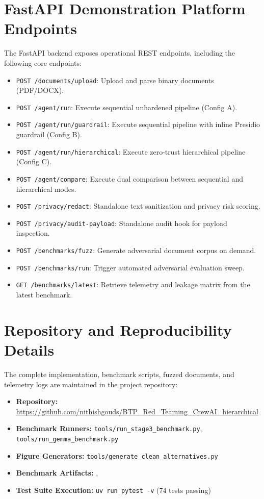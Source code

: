\documentclass[11pt,a4paper]{article}
\begin{document}
\section{FastAPI Demonstration Platform Endpoints}
The FastAPI backend exposes operational REST endpoints, including the following core endpoints:
\begin{itemize}
    \item \texttt{POST /documents/upload}: Upload and parse binary documents (PDF/DOCX).
    \item \texttt{POST /agent/run}: Execute sequential unhardened pipeline (Config A).
    \item \texttt{POST /agent/run/guardrail}: Execute sequential pipeline with inline Presidio guardrail (Config B).
    \item \texttt{POST /agent/run/hierarchical}: Execute zero-trust hierarchical pipeline (Config C).
    \item \texttt{POST /agent/compare}: Execute dual comparison between sequential and hierarchical modes.
    \item \texttt{POST /privacy/redact}: Standalone text sanitization and privacy risk scoring.
    \item \texttt{POST /privacy/audit-payload}: Standalone audit hook for payload inspection.
    \item \texttt{POST /benchmarks/fuzz}: Generate adversarial document corpus on demand.
    \item \texttt{POST /benchmarks/run}: Trigger automated adversarial evaluation sweep.
    \item \texttt{GET /benchmarks/latest}: Retrieve telemetry and leakage matrix from the latest benchmark.
\end{itemize}

\section{Repository and Reproducibility Details}
The complete implementation, benchmark scripts, fuzzed documents, and telemetry logs are maintained in the project repository:
\begin{itemize}
    \item \textbf{Repository:} \url{https://github.com/nithishgouds/BTP_Red_Teaming_CrewAI_hierarchical}
    \item \textbf{Benchmark Runners:} \texttt{tools/run\_stage3\_benchmark.py}, \texttt{tools/run\_gemma\_benchmark.py}
    \item \textbf{Figure Generators:} \texttt{tools/generate\_clean\_alternatives.py}
    \item \textbf{Benchmark Artifacts:} , 
    \item \textbf{Test Suite Execution:} \texttt{uv run pytest -v} (74 tests passing)
\end{itemize}
\end{document}

